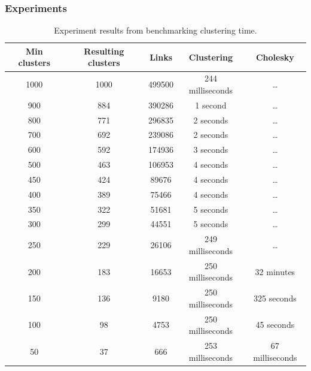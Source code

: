 \subsubsection{Experiments}\label{sec:clustering:experiments}
\begin{table}[H]
    \begin{tabular}{|c|c|c|c|c|}\hline
        Min clusters & Resulting clusters & Links  & Clustering       & Cholesky        \\\hline
        1000         & 1000               & 499500 & 244 milliseconds & \dots           \\\hline
        900          & 884                & 390286 & 1 second         & \dots           \\\hline
        800          & 771                & 296835 & 2 seconds        & \dots           \\\hline
        700          & 692                & 239086 & 2 seconds        & \dots           \\\hline
        600          & 592                & 174936 & 3 seconds        & \dots           \\\hline
        500          & 463                & 106953 & 4 seconds        & \dots           \\\hline
        450          & 424                & 89676  & 4 seconds        & \dots           \\\hline
        400          & 389                & 75466  & 4 seconds        & \dots           \\\hline
        350          & 322                & 51681  & 5 seconds        & \dots           \\\hline
        300          & 299                & 44551  & 5 seconds        & \dots           \\\hline
        250          & 229                & 26106  & 249 milliseconds & \dots           \\\hline
        200          & 183                & 16653  & 250 milliseconds & 32 minutes      \\\hline
        150          & 136                & 9180   & 250 milliseconds & 325 seconds     \\\hline
        100          & 98                 & 4753   & 250 milliseconds & 45 seconds      \\\hline
        50           & 37                 & 666    & 253 milliseconds & 67 milliseconds \\\hline
    \end{tabular}
    \caption{Experiment results from benchmarking clustering time.}
    \label{table:clustering-benchmark}
\end{table}


